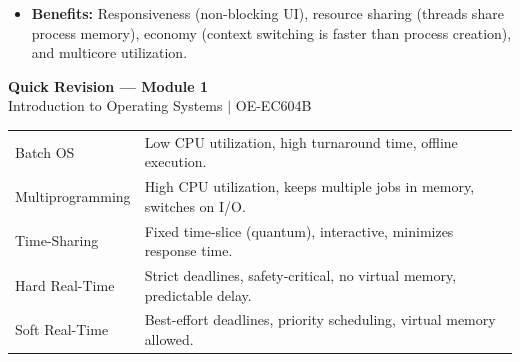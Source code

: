 \documentclass[12pt,a4paper]{article}
\renewcommand{\arraystretch}{1.45}
\begin{document}
\begin{itemize}[leftmargin=*, itemsep=3pt]
  \item \textbf{Benefits:} Responsiveness (non-blocking UI), resource sharing (threads share process memory), economy (context switching is faster than process creation), and multicore utilization.
\end{itemize}

\newpage
\begin{center}
  {\large\bfseries\color{myred} Quick Revision --- Module 1}\\[3pt]
  {\small\color{mydark} Introduction to Operating Systems $|$ OE-EC604B}
\end{center}
\noindent{\color{myred}\rule{\linewidth}{1.2pt}}
\vspace{4pt}

\begin{tcolorbox}[formulabox, title={\textbf{Key Evolution Properties at a Glance}}]
\renewcommand{\arraystretch}{1.3}
\begin{tabularx}{\linewidth}{B{3.8cm} X}
Batch OS & Low CPU utilization, high turnaround time, offline execution. \\[4pt]
Multiprogramming & High CPU utilization, keeps multiple jobs in memory, switches on I/O. \\[4pt]
Time-Sharing & Fixed time-slice (quantum), interactive, minimizes response time. \\[4pt]
Hard Real-Time & Strict deadlines, safety-critical, no virtual memory, predictable delay. \\[4pt]
Soft Real-Time & Best-effort deadlines, priority scheduling, virtual memory allowed.
\end{tabularx}
\end{tcolorbox}
\end{document}

